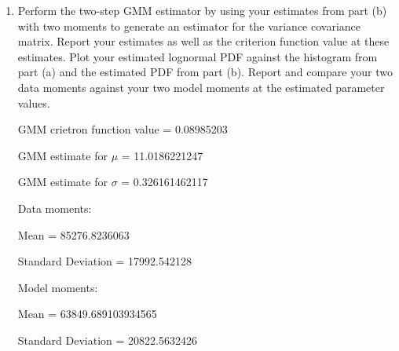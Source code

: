 \documentclass[letterpaper,12pt]{article}
\theoremstyle{definition}
\begin{document}
\begin{enumerate}
\begin{enumerate}
\item Perform the two-step GMM estimator by using your estimates from part (b) with two moments to generate an estimator for the variance covariance matrix. Report your estimates as well as the criterion function value at these estimates. Plot your estimated lognormal PDF against the histogram from part (a) and the estimated PDF from part (b). Report and compare your two data moments against your two model moments at the estimated parameter values.
\par\bigskip
\begin{figure}[H]\centering\captionsetup{width=4.0in}
\end{figure}
\par
GMM crietron function value = 0.08985203\par
GMM estimate for $\mu$ = 11.0186221247 \par
GMM estimate for $\sigma$ = 0.326161462117\par
Data moments:\par
\hspace{2mm} Mean = 85276.8236063\par
\hspace{2mm} Standard Deviation = 17992.542128\par
Model moments:\par
\hspace{2mm}Mean = 63849.689103934565 \par
\hspace{2mm}Standard Deviation = 20822.5632426\par
\bigskip


\end{enumerate}
\end{enumerate}
\end{document}
